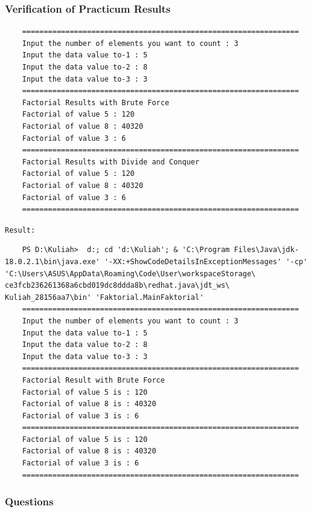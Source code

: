 \documentclass[12pt,titlepage]{article}
\begin{document}
\subsubsection{Verification of Practicum Results}

\begin{verbatim}
    ================================================================
    Input the number of elements you want to count : 3
    Input the data value to-1 : 5
    Input the data value to-2 : 8
    Input the data value to-3 : 3
    ================================================================
    Factorial Results with Brute Force
    Factorial of value 5 : 120
    Factorial of value 8 : 40320
    Factorial of value 3 : 6
    ================================================================
    Factorial Results with Divide and Conquer
    Factorial of value 5 : 120
    Factorial of value 8 : 40320
    Factorial of value 3 : 6
    ================================================================
\end{verbatim}

\texttt{Result: }

\begin{verbatim}
    PS D:\Kuliah>  d:; cd 'd:\Kuliah'; & 'C:\Program Files\Java\jdk-18.0.2.1\bin\java.exe' '-XX:+ShowCodeDetailsInExceptionMessages' '-cp' 'C:\Users\ASUS\AppData\Roaming\Code\User\workspaceStorage\ ce3fcb236261368a6cbd019dc8ddda8b\redhat.java\jdt_ws\ Kuliah_28156aa7\bin' 'Faktorial.MainFaktorial' 
    ================================================================
    Input the number of elements you want to count : 3
    Input the data value to-1 : 5
    Input the data value to-2 : 8
    Input the data value to-3 : 3
    ================================================================
    Factorial Result with Brute Force
    Factorial of value 5 is : 120
    Factorial of value 8 is : 40320
    Factorial of value 3 is : 6
    ================================================================
    Factorial of value 5 is : 120
    Factorial of value 8 is : 40320
    Factorial of value 3 is : 6
    ================================================================
\end{verbatim}

\subsubsection{Questions}
\end{document}
